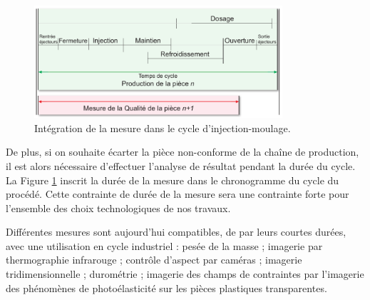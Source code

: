 \begin{figure}[tbhp]
	\centering
	\includegraphics[width=0.82\textwidth,height=\textheight,keepaspectratio]{../Chap1/Figures/SAPRISTI_Chronogramme-Simple.pdf}
	\caption{Intégration de la mesure dans le cycle d'injection-moulage.}
	\label{fig:time_constraint}
\end{figure}

De plus, si on souhaite écarter la pièce non-conforme de la chaîne de production, il est alors nécessaire d'effectuer l'analyse de résultat pendant la durée du cycle.
La Figure \ref{fig:time_constraint} inscrit la durée de la mesure dans le chronogramme du cycle du procédé.  %
Cette contrainte de durée de la mesure sera une contrainte forte pour l'ensemble des choix technologiques de nos travaux.

Différentes mesures sont aujourd'hui compatibles, de par leurs courtes durées, avec une utilisation en cycle industriel : pesée de la masse ; imagerie par thermographie infrarouge ; contrôle d'aspect par caméras ; imagerie tridimensionnelle \cite{schwenke_optical_2002} ; durométrie ; imagerie des champs de contraintes par l'imagerie des phénomènes de photoélasticité sur les pièces plastiques transparentes.



